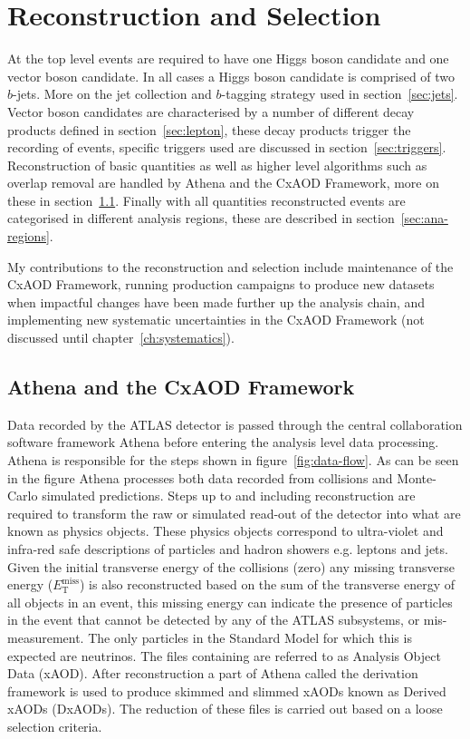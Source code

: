 \chapter{Reconstruction and Selection}%
\label{ch:recon}

At the top level events are required to have one Higgs boson candidate and one
vector boson candidate. In all cases a Higgs boson candidate is comprised of two
$b$-jets. More on the jet collection and $b$-tagging strategy used in
section~\ref{sec:jets}. Vector boson candidates are characterised by a number of
different decay products defined in section~\ref{sec:lepton}, these decay
products trigger the recording of events, specific triggers used are discussed
in section~\ref{sec:triggers}. Reconstruction of basic quantities as well as
higher level algorithms such as overlap removal are handled by Athena and the
CxAOD Framework, more on these in section~\ref{sec:cxaod}. Finally with all
quantities reconstructed events are categorised in different analysis regions,
these are described in section~\ref{sec:ana-regions}.

My contributions to the reconstruction and selection include maintenance of the
CxAOD Framework, running production campaigns to produce new datasets when
impactful changes have been made further up the analysis chain, and implementing
new systematic uncertainties in the CxAOD Framework (not discussed until
chapter~\ref{ch:systematics}).

\section{Athena and the CxAOD Framework}
\label{sec:cxaod} Data recorded by the ATLAS detector is passed through the
central collaboration software framework Athena before entering the analysis
level data processing. 
Athena is responsible for the steps shown in figure~\ref{fig:data-flow}. As can
be seen in the figure Athena processes both data recorded from collisions and
Monte-Carlo simulated predictions. Steps up to and including reconstruction are
required to transform the raw or simulated read-out of the detector into what
are known as physics objects. These physics objects correspond to ultra-violet
and infra-red safe descriptions of particles and hadron showers e.g. leptons and
jets. Given the initial transverse energy of the collisions (zero) any missing
transverse energy ($E_{\mathrm{T}}^{\text{miss}}$) is also reconstructed based
on the sum of the transverse energy of all objects in an event, this missing
energy can indicate the presence of particles in the event that cannot be
detected by any of the ATLAS subsystems, or mis-measurement. The only particles
in the Standard Model for which this is expected are neutrinos. The files
containing are referred to as Analysis Object Data (xAOD). After reconstruction a
part of Athena called the derivation framework is used to produce skimmed and
slimmed xAODs known as Derived xAODs (DxAODs). The reduction of these files is
carried out based on a loose selection criteria.

